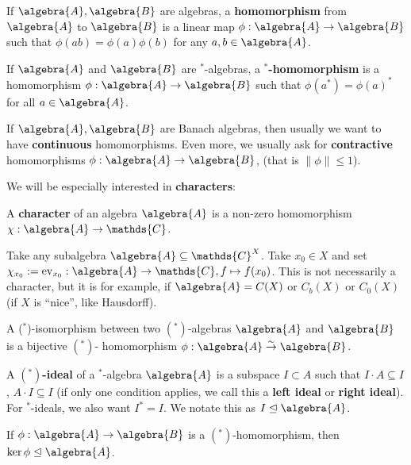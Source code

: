 \documentclass[a4paper]{article}
\begin{document}
\begin{definition}
	If $\algebra{A}, \algebra{B}$ are algebras, a \textbf{homomorphism} from $\algebra{A}$ to $\algebra{B}$ is a linear map $\phi: \algebra{A} \to \algebra{B}$ such that $\phi(ab) = \phi(a) \phi(b)$ for any $a,b \in \algebra{A}$.

	If $\algebra{A}$ and $\algebra{B}$ are $^*$-algebras, a \textbf{$^*$-homomorphism} is a homomorphism $\phi: \algebra{A} \to \algebra{B}$ such that $\phi(a^*) = \phi(a)^*$ for all $a \in \algebra{A}$.

	If $\algebra{A}, \algebra{B}$ are Banach algebras, then usually we want to have \textbf{continuous} homomorphisms. Even more, we usually ask for \textbf{contractive} homomorphisms $\phi: \algebra{A} \to \algebra{B}$, (that is $\|\phi\| \leq 1$).
\end{definition}

We will be especially interested in \textbf{characters}:

\begin{definition}
	A \textbf{character} of an algebra $\algebra{A}$ is a non-zero homomorphism $\chi: \algebra{A} \to \mathds{C}$.
\end{definition}

\begin{example}
	Take any subalgebra $\algebra{A} \subseteq \mathds{C}^X$. Take $x_0 \in X$ and set $\chi_{x_0} := \mathrm{ev}_{x_0}: \algebra{A} \to \mathds{C}, f \mapsto f(x_0)$. This is not necessarily a character, but it is for example, if $\algebra{A} = C(X)$ or $C_b(X)$ or $C_0(X)$ (if $X$ is \enquote{nice}, like Hausdorff).
\end{example}

\begin{definition}
	A  ($^*$)-isomorphism between two $(^*)$-algebras $\algebra{A}$ and $\algebra{B}$ is a bijective $(^*)$- homomorphism $
		\phi: \algebra{A} \overset{\sim}{\to} \algebra{B}$.
\end{definition}

\begin{definition}
	A \textbf{$(^*)$-ideal} of a $^*$-algebra $\algebra{A}$ is a subspace $I \subset A$ such that $I \cdot A \subseteq I$, $A \cdot I \subseteq I$ (if only one condition applies, we call this a \textbf{left ideal} or \textbf{right ideal}). For $^*$-ideals, we also want $I^* = I$. We notate this as $I \trianglelefteq \algebra{A}$.
\end{definition}

\begin{example}
	If $\phi: \algebra{A} \to \algebra{B}$ is a $(^*)$-homomorphism, then $\ker \phi \trianglelefteq \algebra{A}$.
\end{example}
\end{document}
